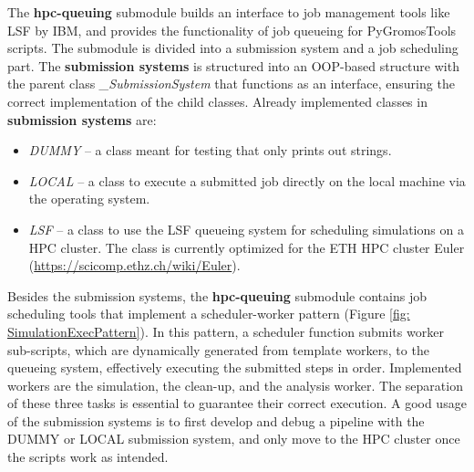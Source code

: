 The \textbf{hpc-queuing} submodule builds an interface to job management tools like LSF by IBM, and provides the functionality of job queueing for PyGromosTools scripts. The submodule is divided into a submission system and a job scheduling part. The \textbf{submission systems} is structured into an OOP-based structure with the parent class \textit{\_SubmissionSystem} that functions as an interface, ensuring the correct implementation of the child classes. Already implemented classes in \textbf{submission systems} are: 
\begin{itemize}
\item \textit{DUMMY} -- a class meant for testing that only prints out strings. 
\item \textit{LOCAL} -- a class to execute a submitted job directly on the local machine via the operating system.
\item \textit{LSF} -- a class to use the LSF queueing system for scheduling simulations on a HPC cluster. The class is currently optimized for the ETH HPC cluster Euler (\url{https://scicomp.ethz.ch/wiki/Euler}).
\end{itemize}
Besides the submission systems, the \textbf{hpc-queuing} submodule contains job scheduling tools that implement a scheduler-worker pattern (Figure \ref{fig: SimulationExecPattern}). In this pattern, a scheduler function submits worker sub-scripts, which are dynamically generated from template workers, to the queueing system, effectively executing the submitted steps in order. Implemented workers are the simulation, the clean-up, and the analysis worker. The separation of these three tasks is essential to guarantee their correct execution.
%
A good usage of the submission systems is to first develop and debug a pipeline with the DUMMY or LOCAL submission system, and only move to the HPC cluster once the scripts work as intended.

